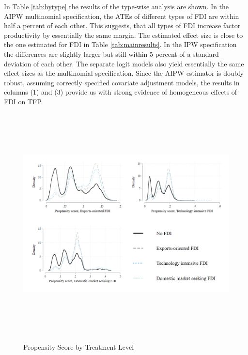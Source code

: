 \documentclass[a4paper,11pt]{scrartcl}
\begin{document}
In Table \ref{tab:bytype} the results of the type-wise analysis are shown. %
 In the AIPW multinomial specification, the ATEs of different types of FDI are within half a percent of each other. This suggests, that all types of FDI increase factor productivity by essentially the same margin. The estimated effect size is close to the one estimated for FDI in Table \ref{tab:mainresults}. In the IPW specification the differences are slightly larger but still within 5 percent of a standard deviation of each other.  The separate logit models also yield essentially the same effect sizes as the multinomial specification.
 Since the AIPW estimator is doubly robust, assuming correctly specified covariate adjustment models, the results in columns (1) and (3) provide us with strong evidence of homogeneous effects of FDI on TFP.


\begin{figure}[h]
	
	\caption{Propensity Score by Treatment Level}
\hspace*{-2cm}  	
	\includegraphics[height=12cm]{overlap_type.png}\\ 
	\label{fig:over_typ}
 
\end{figure}
\end{document}
